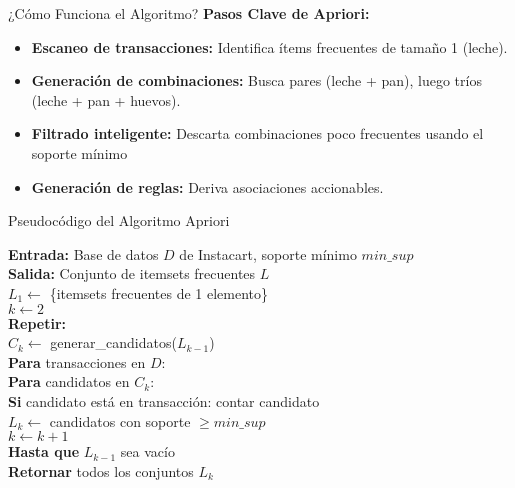 \documentclass{beamer}
\begin{document}
\begin{frame}{¿Cómo Funciona el Algoritmo?}
    \textbf{Pasos Clave de Apriori:}  
    \begin{itemize}
        \item \textbf{Escaneo de transacciones:} Identifica ítems frecuentes de tamaño 1 (leche).
        \item \textbf{Generación de combinaciones:} Busca pares (leche + pan), luego tríos (leche + pan + huevos).
        \item \textbf{Filtrado inteligente:} Descarta combinaciones poco frecuentes usando el soporte mínimo
        \item \textbf{Generación de reglas:} Deriva asociaciones accionables.
    \end{itemize}
\end{frame}

\begin{frame}{Pseudocódigo del Algoritmo Apriori}
    \centering
    \begin{tcolorbox}[
        width=0.95\textwidth,
        colback=blue!10!black,
        colframe=blue!50!black,
        coltext=white,
        arc=0mm,
        boxrule=0.5mm,
        title={\textbf{Algoritmo Apriori}},
        fonttitle=\small\bfseries,
        fontsize=\footnotesize
    ]
    \textbf{Entrada:} Base de datos $D$ de Instacart, soporte mínimo $min\_sup$\\
    \textbf{Salida:} Conjunto de itemsets frecuentes $L$\\[0.1em]
    
    $L_1 \leftarrow$ \{itemsets frecuentes de 1 elemento\}\\
    $k \leftarrow 2$\\
    \textbf{Repetir:}\\
    \hspace{0.5em}$C_k \leftarrow$ generar\_candidatos($L_{k-1}$)\\
    \hspace{0.5em}\textbf{Para} transacciones en $D$:\\
    \hspace{1em}\textbf{Para} candidatos en $C_k$:\\
    \hspace{1.5em}\textbf{Si} candidato está en transacción: contar candidato\\
    \hspace{0.5em}$L_k \leftarrow$ candidatos con soporte $\geq min\_sup$\\
    \hspace{0.5em}$k \leftarrow k + 1$\\
    \textbf{Hasta que} $L_{k-1}$ sea vacío\\
    \textbf{Retornar} todos los conjuntos $L_k$
    \end{tcolorbox}
\end{frame}
\end{document}
